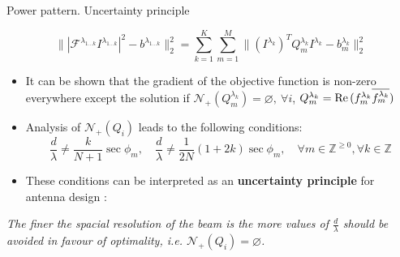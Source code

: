 \documentclass[../main.tex]{subfiles}
\begin{document}
\begin{frame}[t]{Power pattern. Uncertainty principle}

\begin{equation*}
\Big\| |\mathcal{F}^{\lambda_{1 \ldots k}} I^{\lambda_{1\ldots k}}|^2 - b^{\lambda_{1 \ldots k}} \Big\|_2^2 = \sum_{k=1}^K \sum_{m=1}^M \Big\| (I^{\lambda_{k}})^T Q^{\lambda_{k}}_m  I^{\lambda_{k}} - b^{\lambda_{k}}_m \Big\|_2^2
\end{equation*}


 
\begin{itemize}
	\item It can be shown that the gradient of the objective function is non-zero everywhere except the solution if $\mathcal{N}_{+}(Q^{\lambda_{k}}_m) = \varnothing, ~\forall i$, $Q^{\lambda_{k}}_m = \operatorname{Re}{(f_m^{\lambda_{k}} \overline{f_m^{\lambda_{k}}})}$ \cite{iakovlev2019multi}
	\item Analysis of $\mathcal{N}_{+}(Q_i)$ leads to the following conditions:
	\begin{equation*}
  \frac{d}{\lambda} \neq \frac{k}{N+1} \sec \phi_m , \quad \frac{d}{\lambda} \neq \frac{1}{2N} (1 + 2k) \sec \phi_m, \quad \forall m \in \mathbb{Z}^{\ge 0}, \forall k \in \mathbb{Z}
  \label{antenna_design_condition}
	\end{equation*}
	\item These conditions can be interpreted as an \textbf{uncertainty principle} for antenna design \cite{iakovlev2019multi}: 
\end{itemize}

\begin{center}
\begin{tcolorbox}
\textit{The finer the spacial resolution of the beam is the more values of $\frac{d}{\lambda}$ should be avoided in favour of optimality, i.e. $\mathcal{N}_{+}(Q_i) = \varnothing$.}
\end{tcolorbox}
\end{center}

\end{frame}
\end{document}
